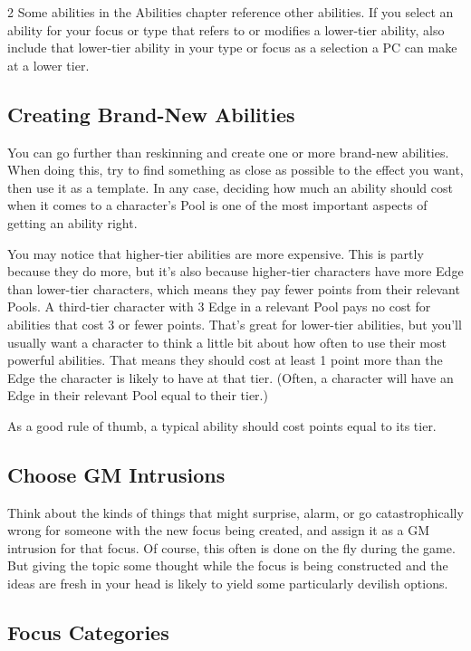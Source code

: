 \begin{multicols}{2}
Some abilities in the Abilities chapter reference other abilities. If you select an ability for your focus or type that refers to or modifies a lower-tier ability, also include that lower-tier ability in your type or focus as a selection a PC can make at a lower tier.

\subsection{Creating Brand-New Abilities}

You can go further than reskinning and create one or more brand-new abilities. When doing this, try to find something as close as possible to the effect you want, then use it as a template. In any case, deciding how much an ability should cost when it comes to a character’s Pool is one of the most important aspects of getting an ability right.

You may notice that higher-tier abilities are more expensive. This is partly because they do more, but it’s also because higher-tier characters have more Edge than lower-tier characters, which means they pay fewer points from their relevant Pools. A third-tier character with 3 Edge in a relevant Pool pays no cost for abilities that cost 3 or fewer points. That’s great for lower-tier abilities, but you’ll usually want a character to think a little bit about how often to use their most powerful abilities. That means they should cost at least 1 point more than the Edge the character is likely to have at that tier. (Often, a character will have an Edge in their relevant Pool equal to their tier.)

As a good rule of thumb, a typical ability should cost points equal to its tier.

\subsection{Choose GM Intrusions}

Think about the kinds of things that might surprise, alarm, or go catastrophically wrong for someone with the new focus being created, and assign it as a GM intrusion for that focus. Of course, this often is done on the fly during the game. But giving the topic some thought while the focus is being constructed and the ideas are fresh in your head is likely to yield some particularly devilish options.

\subsection{Focus Categories}


\end{multicols}
